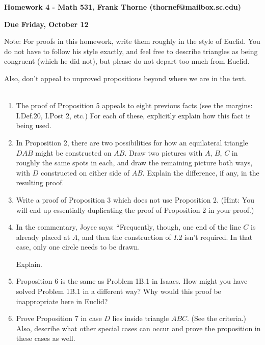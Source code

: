 \documentclass[12pt]{article}
\begin{document}
\setlength{\topmargin}{-2mm}





\begin{center}{\bf Homework 4 - Math 531, Frank Thorne (thornef@mailbox.sc.edu)}
\end{center}
\begin{center}
{\bf Due Friday, October 12}
\end{center}

Note: For proofs in this homework, write them roughly in the style of Euclid.
You do not have to follow his style exactly, and feel free to describe triangles as being
congruent (which he did not), but please do not depart too much from Euclid.

Also, don't appeal to unproved propositions beyond where we are in the text.
\\
\\
\begin{enumerate}[(1)]
\item 
The proof of Proposition 5 appeals to eight previous facts (see the margins: I.Def.20, I.Post 2, etc.)
For each of these, explicitly explain how this fact is being used.

\item
In Proposition 2, there are two possibilities for how an equilateral triangle $DAB$ might be constructed on $AB$.
Draw two pictures with $A$, $B$, $C$ in roughly the same spots in each, and draw the remaining picture both ways, 
with $D$ constructed on either side of $AB$. Explain the difference, if any, in the resulting proof.

\item
Write a proof of Proposition 3 which does not use Proposition 2. (Hint: You will end up essentially duplicating
the proof of Proposition 2 in your proof.)

\item
In the commentary, Joyce says: ``Frequently, though, one end of the line $C$ is already placed at $A$, and then the
construction of $I.2$ isn't required. In that case, only one circle needs to be drawn.

Explain.
\item
Proposition 6 is the same as Problem 1B.1 in Isaacs. How might you have solved Problem 1B.1 in a different way?
Why would this proof be inappropriate here in Euclid?

\item
Prove Proposition 7 in case $D$ lies inside triangle $ABC$. (See the criteria.) Also, describe what other special
cases can occur and prove the proposition in these cases as well.

\end{enumerate}
\end{document}
